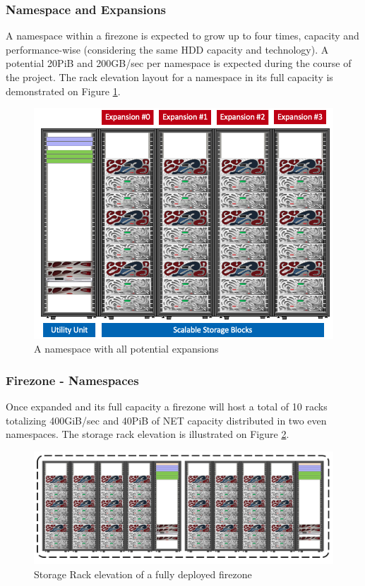 \documentclass{article}
\begin{document}
\subsubsection{Namespace and Expansions}
A namespace within a firezone is expected to grow up to four times, capacity and performance-wise (considering the same HDD capacity and technology). A potential 20PiB and 200GB/sec per namespace is expected during the course of the project. The rack elevation layout for a namespace in its full capacity is demonstrated on Figure \ref{fig:namespace-full}.

\begin{figure}[h]
    \centering
    \includegraphics[scale=0.30]{full-namespace.png}
    \caption{A namespace with all potential expansions}
    \label{fig:namespace-full}
\end{figure}

\subsubsection{Firezone - Namespaces}
Once expanded and its full capacity a firezone will host a total of 10 racks totalizing 400GiB/sec and 40PiB of NET capacity distributed in two even namespaces. The storage rack elevation is illustrated on Figure \ref{fig:firezone-full}.

\begin{figure}[h]
    \centering
    \includegraphics[scale=0.30]{full-firezone.png}
    \caption{Storage Rack elevation of a fully deployed firezone}
    \label{fig:firezone-full}
\end{figure}
\FloatBarrier
\end{document}
